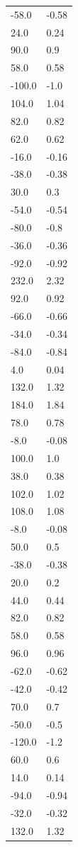 \begin{longtable}{ll}
-58.0 & -0.58 \\
24.0 & 0.24 \\
90.0 & 0.9 \\
58.0 & 0.58 \\
-100.0 & -1.0 \\
104.0 & 1.04 \\
82.0 & 0.82 \\
62.0 & 0.62 \\
-16.0 & -0.16 \\
-38.0 & -0.38 \\
30.0 & 0.3 \\
-54.0 & -0.54 \\
-80.0 & -0.8 \\
-36.0 & -0.36 \\
-92.0 & -0.92 \\
232.0 & 2.32 \\
92.0 & 0.92 \\
-66.0 & -0.66 \\
-34.0 & -0.34 \\
-84.0 & -0.84 \\
4.0 & 0.04 \\
132.0 & 1.32 \\
184.0 & 1.84 \\
78.0 & 0.78 \\
-8.0 & -0.08 \\
100.0 & 1.0 \\
38.0 & 0.38 \\
102.0 & 1.02 \\
108.0 & 1.08 \\
-8.0 & -0.08 \\
50.0 & 0.5 \\
-38.0 & -0.38 \\
20.0 & 0.2 \\
44.0 & 0.44 \\
82.0 & 0.82 \\
58.0 & 0.58 \\
96.0 & 0.96 \\
-62.0 & -0.62 \\
-42.0 & -0.42 \\
70.0 & 0.7 \\
-50.0 & -0.5 \\
-120.0 & -1.2 \\
60.0 & 0.6 \\
14.0 & 0.14 \\
-94.0 & -0.94 \\
-32.0 & -0.32 \\
132.0 & 1.32 \\

\end{longtable}
